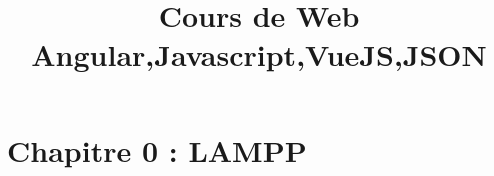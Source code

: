 \documentclass[a4paper,12pt]{book}
\title{Cours de Web Angular,Javascript,VueJS,JSON}
\begin{document}
\maketitle

\chapter{Chapitre 0 : LAMPP}
\end{document}
